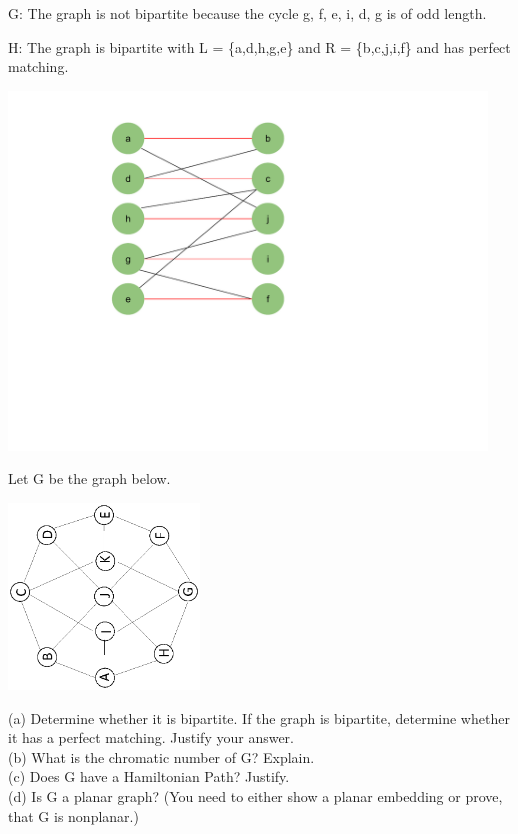 \documentclass{article}
\begin{document}
\begin{solution}

G: The graph is not bipartite because the cycle g, f, e, i, d, g is of odd length.

H: The graph is bipartite with L = \{a,d,h,g,e\} and R = \{b,c,j,i,f\} and has perfect matching.

\begin{center}
\includegraphics[width=5.0in]{HW5_pics/HW5Solution2b.pdf}
\end{center}

\end{solution}
\begin{problem}
Let G be the graph below. 
	\begin{center}
		\includegraphics[angle = 270, width = 2in]{HW5_pics/Graph1HW5.eps}
	\end{center}
	
\noindent (a) Determine whether it is bipartite. If the graph is bipartite, determine whether it has a perfect matching. Justify your answer.\\
(b) What is the chromatic number of G? Explain.\\
(c) Does G have a Hamiltonian Path? Justify.\\
(d) Is G a planar graph? (You need to either show a planar embedding or prove, that G is nonplanar.)
\end{problem}
\end{document}
